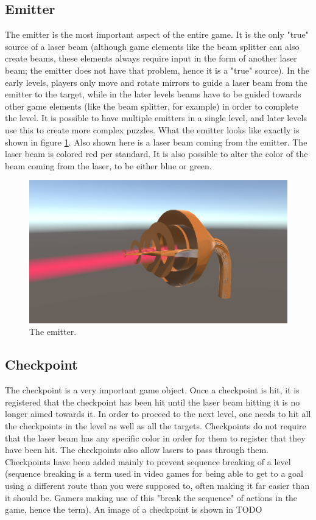 		\subsection{Emitter} \label{ssec:emitter}
			The emitter is the most important aspect of the entire game.
			It is the only "true" source of a laser beam (although game
			elements like the beam splitter can also create beams, these
			elements always require input in the form of another laser
			beam; the emitter does not have that problem, hence it is a "true"
			source). In the early levels, players only move and rotate mirrors
			to guide a laser beam from the emitter to the target, while in the
			later levels beams have to be guided towards other game elements
			(like the beam splitter, for example) in order to complete the
			level. It is possible to have multiple emitters in a single level,
			and later levels use this to create more complex puzzles.
			What the emitter looks like exactly is shown in figure 
			\ref{fig:emitter}. Also shown here is a laser beam
			coming from the emitter. The laser beam is colored red per 
			standard. It is also possible to alter the color of the beam coming
			from the laser, to be either blue or green.
			\begin{figure}[!ht]
				\centering
				\includegraphics[scale = 0.25]{Emitter}
				\caption{The emitter.}
				\label{fig:emitter}
			\end{figure}
			
		\subsection{Checkpoint}
			The checkpoint is a very important game object. Once a checkpoint is
			hit, it is registered that the checkpoint has been hit until the
			laser beam hitting it is no longer aimed towards it. In order to
			proceed to the next level, one needs to hit all the checkpoints
			in the level as well as all the targets. Checkpoints do not require
			that the laser beam has any specific color in order for them to register
			that they have been hit. The checkpoints also allow lasers to pass
			through them. Checkpoints have been added mainly to prevent sequence
			breaking of a level (sequence breaking is a term used in video games
			for being able to get to a goal using a different route than you were
			supposed to, often making it far easier than it should be. Gamers making
			use of this "break the sequence" of actions in the game, hence the term).
			An image of a checkpoint is shown in TODO
			
